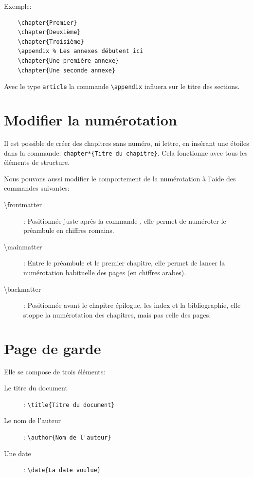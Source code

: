 Exemple:
\begin{verbatim}
    \chapter{Premier}
    \chapter{Deuxième}
    \chapter{Troisième}
    \appendix % Les annexes débutent ici
    \chapter{Une première annexe}
    \chapter{Une seconde annexe}
\end{verbatim}
\medskip

Avec le type \texttt{article} la commande \verb|\appendix| influera sur le titre des sections.
\medskip

\section{Modifier la numérotation}
Il est possible de créer des chapitres sans numéro, ni lettre, en insérant une étoiles dans la commande: \verb|chapter*{Titre du chapitre}|. Cela fonctionne avec tous les éléments de structure.
\medskip

Nous pouvons aussi modifier le comportement de la numérotation à l'aide des commandes suivantes:
\begin{description}
\item[\textbackslash frontmatter]: Positionnée juste après la commande \verb||, elle permet de numéroter le préambule en chiffres romains.
\item[\textbackslash mainmatter]: Entre le préambule et le premier chapitre, elle permet de lancer la numérotation habituelle des pages (en chiffres arabes).
\item[\textbackslash backmatter]: Positionnée avant le chapitre épilogue, les index et la bibliographie, elle stoppe la numérotation des chapitres, mais pas celle des pages.
\end{description}
\medskip

\section{Page de garde}
Elle se compose de trois éléments:
\begin{description}
\item[Le titre du document]: \verb|\title{Titre du document}|
\item[Le nom de l'auteur]: \verb|\author{Nom de l'auteur}|
\item[Une date]: \verb|\date{La date voulue}|
\end{description}
\medskip

